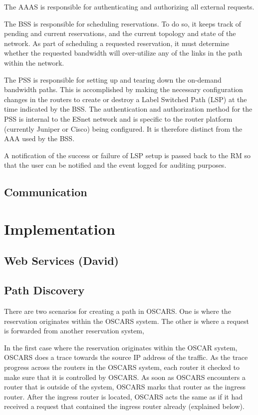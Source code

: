 \documentclass[conference]{IEEEtran}
\begin{document}
The AAAS is responsible for authenticating and authorizing all external 
requests.

The BSS is responsible for scheduling reservations.  To do so, it keeps track 
of pending and current reservations, and the current topology and state of
the network.  As part of scheduling a requested reservation, it must
determine whether the requested bandwidth will over-utilize any of the links
in the path within the network.

The PSS is responsible for setting up and tearing down the on-demand bandwidth 
paths. This is accomplished by making the necessary configuration changes in 
the routers to create or destroy a Label Switched Path (LSP) at the time
indicated by the BSS. The authentication and authorization method for the PSS 
is internal to the ESnet network and is specific to the router platform 
(currently Juniper or Cisco) being configured.  It is therefore distinct from 
the AAA used by the BSS.

A notification of the success or failure of LSP setup is 
passed back to the RM so that the user can be notified and the event 
logged for auditing purposes.

\subsection{Communication}

\section{Implementation}
\subsection{Web Services (David)}
\subsection{Path Discovery}
There are two scenarios for creating a path in OSCARS.  One is where the
reservation originates within the OSCARS system.  The other is where a request
is forwarded from another reservation system, 

In the first case where the reservation originates within the OSCAR system,
OSCARS does a trace towards the source IP address of the traffic. As the trace
progress across the routers in the OSCARS system, each router it checked to make
sure that it is controlled by OSCARS. As soon as OSCARS encounters a router that
is outside of the system, OSCARS marks that router as the ingress router. After
the ingress router is located, OSCARS acts the same as if it had received a
request that contained the ingress router already (explained below).
\end{document}
